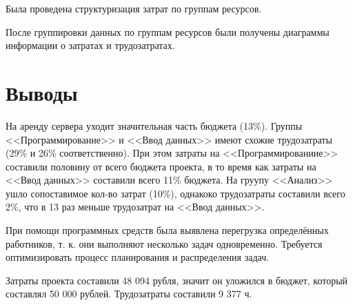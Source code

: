 \documentclass{bmstu}
\begin{document}
Была проведена структуризация затрат по группам ресурсов.


После группировки данных по группам ресурсов были получены диаграммы информации о затратах и трудозатратах.


\clearpage


\section*{Выводы}

На аренду сервера уходит значительная часть бюджета (13\%).
Группы <<Программирование>> и <<Ввод данных>> имеют схожие трудозатраты (29\% и 26\% соответственно). При этом затраты на <<Программированиие>> составили половину от всего бюджета проекта, в то время как затраты на <<Ввод данных>> составили всего 11\% бюджета. На груупу <<Анализ>> ушло сопоставимое кол-во затрат (10\%), однакоко трудозатраты составили всего 2\%, что в 13 раз меньше трудозатрат на <<Ввод данных>>.

При помощи программных средств была выявлена перегрузка определённых работников, т. к. они выполняют несколько задач одновременно. Требуется оптимизировать процесс планирования и распределения задач.

Затраты проекта составили 48 094 рубля, значит он уложился в бюджет, который составлял 50 000 рублей. Трудозатраты составили 9 377 ч.
\end{document}
